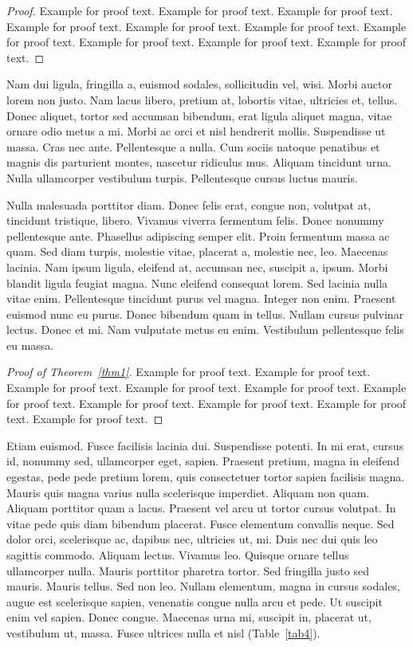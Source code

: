 \documentclass[ASNA,twocolumn]{USG} %
\begin{document}
\begin{proof}
Example for proof text. Example for proof text. Example for proof text. Example for proof text. Example for proof text. Example for proof text. Example for proof text. Example for proof text. Example for proof text. Example for proof text.
\end{proof}

Nam dui ligula, fringilla a, euismod sodales, sollicitudin vel, wisi. Morbi auctor lorem non justo. Nam lacus libero,
pretium at, lobortis vitae, ultricies et, tellus. Donec aliquet, tortor sed accumsan bibendum, erat ligula aliquet magna,
vitae ornare odio metus a mi. Morbi ac orci et nisl hendrerit mollis. Suspendisse ut massa. Cras nec ante. Pellentesque
a nulla. Cum sociis natoque penatibus et magnis dis parturient montes, nascetur ridiculus mus. Aliquam tincidunt
urna. Nulla ullamcorper vestibulum turpis. Pellentesque cursus luctus mauris.

Nulla malesuada porttitor diam. Donec felis erat, congue non, volutpat at, tincidunt tristique, libero. Vivamus
viverra fermentum felis. Donec nonummy pellentesque ante. Phasellus adipiscing semper elit. Proin fermentum massa
ac quam. Sed diam turpis, molestie vitae, placerat a, molestie nec, leo. Maecenas lacinia. Nam ipsum ligula, eleifend
at, accumsan nec, suscipit a, ipsum. Morbi blandit ligula feugiat magna. Nunc eleifend consequat lorem. Sed lacinia
nulla vitae enim. Pellentesque tincidunt purus vel magna. Integer non enim. Praesent euismod nunc eu purus. Donec
bibendum quam in tellus. Nullam cursus pulvinar lectus. Donec et mi. Nam vulputate metus eu enim. Vestibulum
pellentesque felis eu massa.

\begin{proof}[Proof of Theorem~{\rm\ref{thm1}}]
Example for proof text. Example for proof text. Example for proof text. Example for proof text. Example for proof text. Example for proof text. Example for proof text. Example for proof text. Example for proof text. Example for proof text.
\end{proof}



Etiam euismod. Fusce facilisis lacinia dui. Suspendisse potenti. In mi erat, cursus id, nonummy sed, ullamcorper
eget, sapien. Praesent pretium, magna in eleifend egestas, pede pede pretium lorem, quis consectetuer tortor sapien
facilisis magna. Mauris quis magna varius nulla scelerisque imperdiet. Aliquam non quam. Aliquam porttitor quam
a lacus. Praesent vel arcu ut tortor cursus volutpat. In vitae pede quis diam bibendum placerat. Fusce elementum
convallis neque. Sed dolor orci, scelerisque ac, dapibus nec, ultricies ut, mi. Duis nec dui quis leo sagittis commodo.
Aliquam lectus. Vivamus leo. Quisque ornare tellus ullamcorper nulla. Mauris porttitor pharetra tortor. Sed fringilla
justo sed mauris. Mauris tellus. Sed non leo. Nullam elementum, magna in cursus sodales, augue est scelerisque
sapien, venenatis congue nulla arcu et pede. Ut suscipit enim vel sapien. Donec congue. Maecenas urna mi, suscipit
in, placerat ut, vestibulum ut, massa. Fusce ultrices nulla et nisl (Table~\ref{tab4}).
\end{document}
